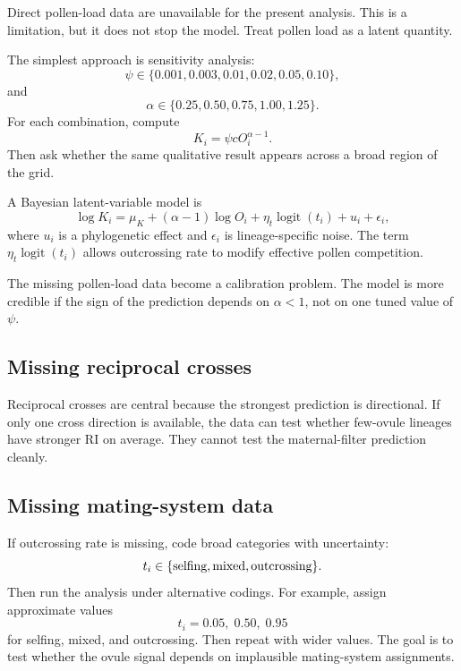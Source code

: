 \documentclass[12pt]{article}
\newcommand{\logit}{\operatorname{logit}}
\begin{document}
Direct pollen-load data are unavailable for the present analysis. This is a limitation, but it does not stop the model. Treat pollen load as a latent quantity.

The simplest approach is sensitivity analysis:
\begin{equation}
\psi\in\{0.001,0.003,0.01,0.02,0.05,0.10\},
\end{equation}
and
\begin{equation}
\alpha\in\{0.25,0.50,0.75,1.00,1.25\}.
\end{equation}
For each combination, compute
\begin{equation}
K_i=\psi cO_i^{\alpha-1}.
\end{equation}
Then ask whether the same qualitative result appears across a broad region of the grid.

A Bayesian latent-variable model is
\begin{equation}
\log K_i=\mu_K+(\alpha-1)\log O_i+\eta_t\logit(t_i)+u_i+\epsilon_i,
\label{eq:latentK}
\end{equation}
where $u_i$ is a phylogenetic effect and $\epsilon_i$ is lineage-specific noise. The term $\eta_t\logit(t_i)$ allows outcrossing rate to modify effective pollen competition.

\begin{conclusionbox}
The missing pollen-load data become a calibration problem. The model is more credible if the sign of the prediction depends on $\alpha<1$, not on one tuned value of $\psi$.
\end{conclusionbox}

\subsection{Missing reciprocal crosses}

Reciprocal crosses are central because the strongest prediction is directional. If only one cross direction is available, the data can test whether few-ovule lineages have stronger RI on average. They cannot test the maternal-filter prediction cleanly.

\subsection{Missing mating-system data}

If outcrossing rate is missing, code broad categories with uncertainty:
\begin{equation}
t_i\in\{\hbox{selfing},\hbox{mixed},\hbox{outcrossing}\}.
\end{equation}
Then run the analysis under alternative codings. For example, assign approximate values
\begin{equation}
t_i=0.05,\;0.50,\;0.95
\end{equation}
for selfing, mixed, and outcrossing. Then repeat with wider values. The goal is to test whether the ovule signal depends on implausible mating-system assignments.
\end{document}
